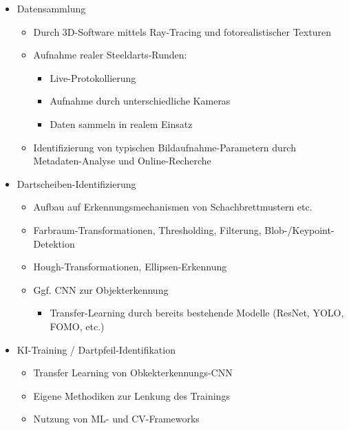 \iffalse
\begin{itemize}
    \item Datensammlung
    \begin{itemize}
        \raggedright
        \item Durch 3D-Software mittels Ray-Tracing und fotorealistischer Texturen
        \item Aufnahme realer Steeldarts-Runden:
        \begin{itemize}
            \item Live-Protokollierung
            \item Aufnahme durch unterschiedliche Kameras
            \item Daten sammeln in realem Einsatz
        \end{itemize}
        \item Identifizierung von typischen Bildaufnahme-Parametern durch Metadaten-Analyse und Online-Recherche
    \end{itemize}

    \item Dartscheiben-Identifizierung
    \begin{itemize}
        \raggedright
        \item Aufbau auf Erkennungsmechanismen von Schachbrettmustern etc.
        \item Farbraum-Transformationen, Thresholding, Filterung, Blob-/Keypoint-Detektion
        \item Hough-Transformationen, Ellipsen-Erkennung
        \item Ggf. CNN zur Objekterkennung
        \begin{itemize}
            \item Transfer-Learning durch bereits bestehende Modelle (ResNet, YOLO, FOMO, etc.)
        \end{itemize}
    \end{itemize}

    \item KI-Training / Dartpfeil-Identifikation
    \begin{itemize}
        \item Transfer Learning von Obkekterkennungs-CNN
        \item Eigene Methodiken zur Lenkung des Trainings
        \item Nutzung von ML- und CV-Frameworks
    \end{itemize}


\end{itemize}
